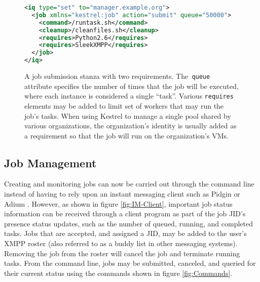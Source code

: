 %
\begin{figure}
\begin{lstlisting}[language=XML,tabsize=4]
<iq type="set" to="manager.example.org"> 
  <job xmlns="kestrel:job" action="submit" queue="50000"> 
    <command>/runtask.sh</command> 
    <cleanup>/cleanfiles.sh</cleanup> 
    <requires>Python2.6</requires> 
    <requires>SleekXMPP</requires> 
  </job> 
</iq>
\end{lstlisting}
\caption{\label{fig:Job-Stanza} A job submission stanza with two requirements.
The\texttt{ queue} attribute specifies the number of times that the
job will be executed, where each instance is considered a single {}``task''.
Various \texttt{requires} elements may be added to limit set of workers
that may run the job's tasks. When using Kestrel to manage a single
pool shared by various organizations, the organization's identity
is usually added as a requirement so that the job will run on the
organization's VMs.}

\end{figure}



\subsection{Job Management}

\label{sec:Kestrel:Management} Creating and monitoring jobs can now
be carried out through the command line instead of having to rely
upon an instant messaging client such as Pidgin \cite{Pidgin} or
Adium \cite{Adium}. However, as shown in figure \ref{fig:IM-Client},
important job status information can be received through a client
program as part of the job JID's presence status updates, such as
the number of queued, running, and completed tasks. Jobs that are
accepted, and assigned a JID, may be added to the user's XMPP roster
(also referred to as a buddy list in other messaging systems). Removing
the job from the roster will cancel the job and terminate running
tasks. From the command line, jobs may be submitted, canceled, and
queried for their current status using the commands shown in figure
\ref{fig:Commands}.

